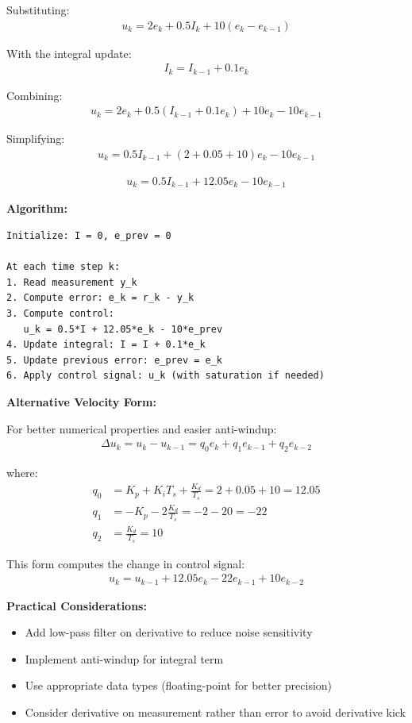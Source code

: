 \documentclass[11pt,a4paper]{article}
\begin{document}
Substituting:
\begin{align}
u_k = 2e_k + 0.5I_k + 10(e_k - e_{k-1})
\end{align}

With the integral update:
\begin{align}
I_k = I_{k-1} + 0.1e_k
\end{align}

Combining:
\begin{align}
u_k = 2e_k + 0.5(I_{k-1} + 0.1e_k) + 10e_k - 10e_{k-1}
\end{align}

Simplifying:
\begin{align}
u_k = 0.5I_{k-1} + (2 + 0.05 + 10)e_k - 10e_{k-1}
\end{align}

\begin{align}
u_k = 0.5I_{k-1} + 12.05e_k - 10e_{k-1}
\end{align}

\textbf{Algorithm:}

\begin{verbatim}
Initialize: I = 0, e_prev = 0

At each time step k:
1. Read measurement y_k
2. Compute error: e_k = r_k - y_k
3. Compute control:
   u_k = 0.5*I + 12.05*e_k - 10*e_prev
4. Update integral: I = I + 0.1*e_k
5. Update previous error: e_prev = e_k
6. Apply control signal: u_k (with saturation if needed)
\end{verbatim}

\textbf{Alternative Velocity Form:}

For better numerical properties and easier anti-windup:
\begin{align}
\Delta u_k = u_k - u_{k-1} = q_0 e_k + q_1 e_{k-1} + q_2 e_{k-2}
\end{align}

where:
\begin{align}
q_0 &= K_p + K_i T_s + \frac{K_d}{T_s} = 2 + 0.05 + 10 = 12.05 \\
q_1 &= -K_p - 2\frac{K_d}{T_s} = -2 - 20 = -22 \\
q_2 &= \frac{K_d}{T_s} = 10
\end{align}

This form computes the change in control signal:
\begin{align}
u_k = u_{k-1} + 12.05e_k - 22e_{k-1} + 10e_{k-2}
\end{align}

\textbf{Practical Considerations:}
\begin{itemize}
\item Add low-pass filter on derivative to reduce noise sensitivity
\item Implement anti-windup for integral term
\item Use appropriate data types (floating-point for better precision)
\item Consider derivative on measurement rather than error to avoid derivative kick
\end{itemize}
\end{document}
